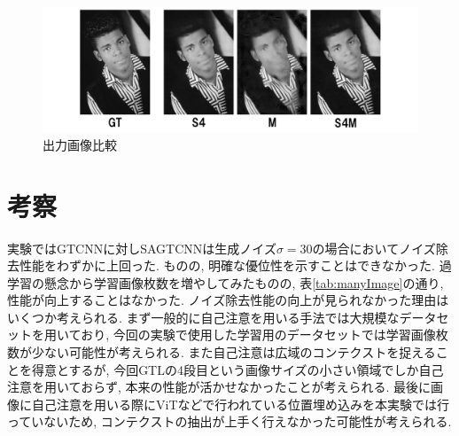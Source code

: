 \begin{figure}[htbp]
\centering
\includegraphics[scale=1.0]{figures/Outputs.png}
\caption{出力画像比較　\label{fig:Outputs}}
\end{figure}

\newpage
\section{考察}
実験ではGTCNNに対しSAGTCNNは生成ノイズ$\sigma = 30$の場合においてノイズ除去性能をわずかに上回った. ものの, 明確な優位性を示すことはできなかった. 過学習の懸念から学習画像枚数を増やしてみたものの, 表\ref{tab:manyImage}の通り, 性能が向上することはなかった. ノイズ除去性能の向上が見られなかった理由はいくつか考えられる. まず一般的に自己注意を用いる手法では大規模なデータセットを用いており, 今回の実験で使用した学習用のデータセットでは学習画像枚数が少ない可能性が考えられる. また自己注意は広域のコンテクストを捉えることを得意とするが, 今回GTLの4段目という画像サイズの小さい領域でしか自己注意を用いておらず, 本来の性能が活かせなかったことが考えられる. 最後に画像に自己注意を用いる際にViTなどで行われている位置埋め込みを本実験では行っていないため, コンテクストの抽出が上手く行えなかった可能性が考えられる. 


